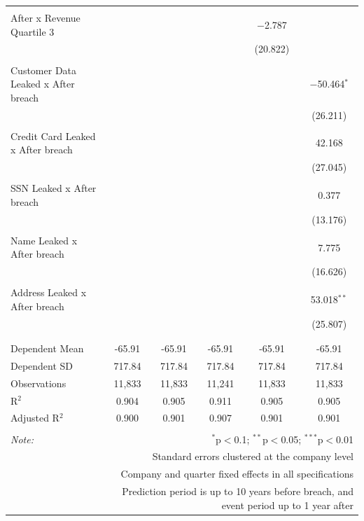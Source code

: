 \documentclass[../Main.tex]{subfiles}
\begin{document}
\begin{table}[!htbp]
{\begin{tabular}{@{\extracolsep{5pt}}lccccc}
  & & & & & \\ 
 After x Revenue Quartile 3 &  &  &  & $-$2.787 &  \\ 
  &  &  &  & (20.822) &  \\ 
  & & & & & \\ 
 Customer Data Leaked x After breach &  &  &  &  & $-$50.464$^{*}$ \\ 
  &  &  &  &  & (26.211) \\ 
  & & & & & \\ 
 Credit Card Leaked x After breach &  &  &  &  & 42.168 \\ 
  &  &  &  &  & (27.045) \\ 
  & & & & & \\ 
 SSN Leaked x After breach &  &  &  &  & 0.377 \\ 
  &  &  &  &  & (13.176) \\ 
  & & & & & \\ 
 Name Leaked x After breach &  &  &  &  & 7.775 \\ 
  &  &  &  &  & (16.626) \\ 
  & & & & & \\ 
 Address Leaked x After breach &  &  &  &  & 53.018$^{**}$ \\ 
  &  &  &  &  & (25.807) \\ 
  & & & & & \\ 
\hline \\[-1.8ex] 
Dependent Mean & -65.91 & -65.91 & -65.91 & -65.91 & -65.91 \\ 
Dependent SD & 717.84 & 717.84 & 717.84 & 717.84 & 717.84 \\ 
Observations & 11,833 & 11,833 & 11,241 & 11,833 & 11,833 \\ 
R$^{2}$ & 0.904 & 0.905 & 0.911 & 0.905 & 0.905 \\ 
Adjusted R$^{2}$ & 0.900 & 0.901 & 0.907 & 0.901 & 0.901 \\ 
\hline 
\hline \\[-1.8ex] 
\textit{Note:}  & \multicolumn{5}{r}{$^{*}$p$<$0.1; $^{**}$p$<$0.05; $^{***}$p$<$0.01} \\ 
 & \multicolumn{5}{r}{Standard errors clustered at the company level} \\ 
 & \multicolumn{5}{r}{Company and quarter fixed effects in all specifications} \\ 
 & \multicolumn{5}{r}{Prediction period is up to 10 years before breach, and event period up to 1 year after} \\ 
\end{tabular}} 
\end{table} 
\end{document}
